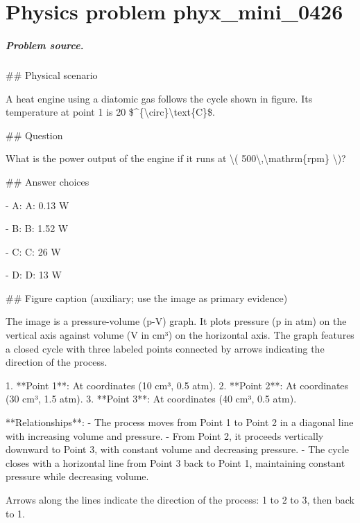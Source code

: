 
\chapter{Physics problem phyx\_mini\_0426}
\label{ch:PhyXMiniProblems_problem_phyx_mini_0426}

\paragraph{Problem source.}
\#\# Physical scenario

A heat engine using a diatomic gas follows the cycle shown in figure. Its temperature at point 1 is 20 \$\textasciicircum{}\{\textbackslash{}circ\}\textbackslash{}text\{C\}\$.

\#\# Question

What is the power output of the engine if it runs at \textbackslash{}( 500\textbackslash{},\textbackslash{}mathrm\{rpm\} \textbackslash{})?

\#\# Answer choices

- A: A: 0.13 W

- B: B: 1.52 W

- C: C: 26 W

- D: D: 13 W

\#\# Figure caption (auxiliary; use the image as primary evidence)

The image is a pressure-volume (p-V) graph. It plots pressure (p in atm) on the vertical axis against volume (V in cm³) on the horizontal axis. The graph features a closed cycle with three labeled points connected by arrows indicating the direction of the process.

1. **Point 1**: At coordinates (10 cm³, 0.5 atm).
2. **Point 2**: At coordinates (30 cm³, 1.5 atm).
3. **Point 3**: At coordinates (40 cm³, 0.5 atm).

**Relationships**:
- The process moves from Point 1 to Point 2 in a diagonal line with increasing volume and pressure.
- From Point 2, it proceeds vertically downward to Point 3, with constant volume and decreasing pressure.
- The cycle closes with a horizontal line from Point 3 back to Point 1, maintaining constant pressure while decreasing volume.

Arrows along the lines indicate the direction of the process: 1 to 2 to 3, then back to 1.

